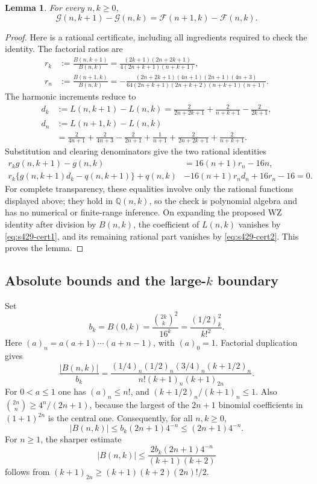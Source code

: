 \documentclass[11pt,a4paper]{article}
\newtheorem{lemma}[theorem]{Lemma}
\theoremstyle{remark}\newtheorem{remark}[theorem]{Remark}
\numberwithin{equation}{section}
\begin{document}
\begin{lemma}\label{lem:s429-wz}
For every $n,k\ge0$,
\[
 \mathcal G(n,k+1)-\mathcal G(n,k)
 =\mathcal F(n+1,k)-\mathcal F(n,k).
\]
\end{lemma}
\begin{proof}
Here is a rational certificate, including all ingredients required to
check the identity. The factorial ratios are
\begin{align*}
 r_k&:=\frac{B(n,k+1)}{B(n,k)}
 =\frac{(2k+1)(2n+2k+1)}{4(2n+k+1)(n+k+1)},\\
 r_n&:=\frac{B(n+1,k)}{B(n,k)}
 =-\frac{(2n+2k+1)(4n+1)(2n+1)(4n+3)}
 {64(2n+k+1)(2n+k+2)(n+k+1)(n+1)}.
\end{align*}
The harmonic increments reduce to
\begin{align*}
 d_k&:=L(n,k+1)-L(n,k)
 =\frac2{2n+2k+1}+\frac2{n+k+1}-\frac2{2k+1},\\
 d_n&:=L(n+1,k)-L(n,k)\\
 &=\frac2{4n+1}+\frac2{4n+3}-\frac2{2n+1}
   +\frac1{n+1}+\frac2{2n+2k+1}+\frac2{n+k+1}.
\end{align*}
Substitution and clearing denominators give the two rational identities
\begin{align}
 r_kg(n,k+1)-g(n,k)&=16(n+1)r_n-16n,
 \label{eq:s429-cert1}\\
 r_k\{g(n,k+1)d_k-q(n,k+1)\}+q(n,k)
 &-16(n+1)r_nd_n+16r_n-16=0.
 \label{eq:s429-cert2}
\end{align}
For complete transparency, these equalities involve only the rational
functions displayed above; they hold in $\mathbb Q(n,k)$, so the check
is polynomial algebra and has no numerical or finite-range inference.
On expanding the proposed WZ identity after division by $B(n,k)$,
the coefficient of $L(n,k)$ vanishes by
\eqref{eq:s429-cert1}, and its remaining rational part vanishes by
\eqref{eq:s429-cert2}. This proves the lemma.
\end{proof}

\subsection{Absolute bounds and the large-$k$ boundary}
Set
\[
 b_k=B(0,k)=\frac{\binom{2k}{k}^{\!2}}{16^k}
 =\frac{(1/2)_k^2}{k!^2}.
\]
Here $(a)_n=a(a+1)\cdots(a+n-1)$, with $(a)_0=1$.
Factorial duplication gives
\begin{equation}\label{eq:s429-rising}
 \frac{|B(n,k)|}{b_k}
 =\frac{(1/4)_n(1/2)_n(3/4)_n(k+1/2)_n}
 {n!(k+1)_n(k+1)_{2n}}.
\end{equation}
For $0<a\le1$ one has $(a)_n\le n!$, and
$(k+1/2)_n/(k+1)_n\le1$. Also
$\binom{2n}{n}\ge4^n/(2n+1)$, because the largest of the
$2n+1$ binomial coefficients in $(1+1)^{2n}$ is the central one.
Consequently, for all $n,k\ge0$,
\begin{equation}\label{eq:s429-bound1}
 |B(n,k)|\le b_k(2n+1)4^{-n}\le(2n+1)4^{-n}.
\end{equation}
For $n\ge1$, the sharper estimate
\begin{equation}\label{eq:s429-bound2}
 |B(n,k)|\le
 \frac{2b_k(2n+1)4^{-n}}{(k+1)(k+2)}
\end{equation}
follows from
$(k+1)_{2n}\ge(k+1)(k+2)(2n)!/2$.
\end{document}
